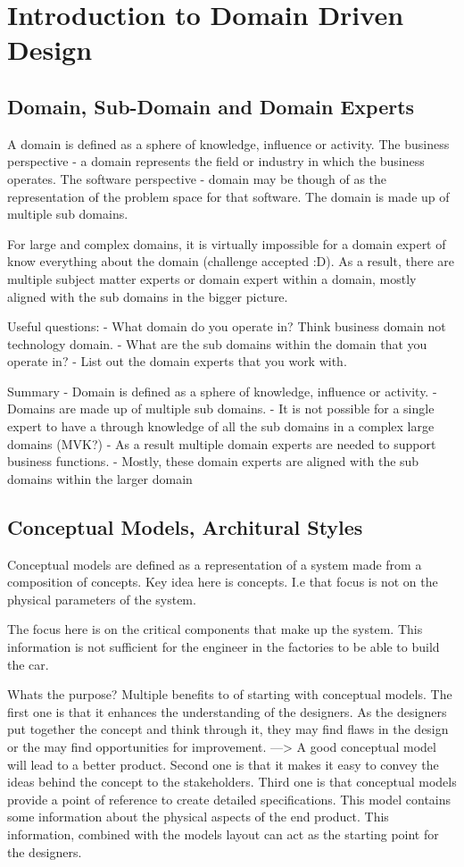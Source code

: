 \chapter{Introduction to Domain Driven Design}

\section{Domain, Sub-Domain and Domain Experts}
A domain is defined as a sphere of knowledge, influence or activity.
The business perspective - a domain represents the field or industry in which the business operates.
The software perspective - domain may be though of as the representation of the problem space for that software. The domain is made up of multiple sub domains.

For large and complex domains, it is virtually impossible for a domain expert of know everything about the domain (challenge accepted :D).
As a result, there are multiple subject matter experts or domain expert within a domain, mostly aligned with the sub domains in the bigger picture.

Useful questions:
- What domain do you operate in? Think business domain not technology domain.
- What are the sub domains within the domain that you operate in?
- List out the domain experts that you work with.

Summary
- Domain is defined as a sphere of knowledge, influence or activity.
- Domains are made up of multiple sub domains.
    - It is not possible for a single expert to have a through knowledge of all the sub domains in a complex large domains (MVK?)
    - As a result multiple domain experts are needed to support business functions.
    - Mostly, these domain experts are aligned with the sub domains within the larger domain

\section{Conceptual Models, Architural Styles}
Conceptual models are defined as a representation of a system made from a composition of concepts. Key idea here is concepts.
I.e that focus is not on the physical parameters of the system.

The focus here is on the critical components that make up the system.
This information is not sufficient for the engineer in the factories to be able to build the car.

Whats the purpose?
Multiple benefits to of starting with conceptual models.
The first one is that it enhances the understanding of the designers.
As the designers put together the concept and think through it, they may find flaws in the design or the may find opportunities for improvement.
---> A good conceptual model will lead to a better product.
Second one is that it makes it easy to convey the ideas behind the concept to the stakeholders.
Third one is that conceptual models provide a point of reference to create detailed specifications.
This model contains some information about the physical aspects of the end product.
This information, combined with the models layout can act as the starting point for the designers.

